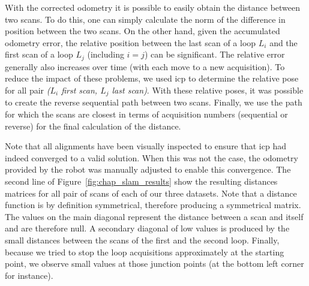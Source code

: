 With the corrected odometry it is possible to easily obtain the distance between two scans. To do this, one can simply calculate the norm of the difference in position between the two scans. On the other hand, given the accumulated odometry error, the relative position between the last scan of a loop $L_i$ and the first scan of a loop $L_j$ (including $i=j$) can be significant. The relative error generally also increases over time (with each move to a new acquisition). To reduce the impact of these problems, we used \gls*{icp} to determine the relative pose for all pair \textit{($L_i$ first scan, $L_j$ last scan)}. With these relative poses, it was possible to create the reverse sequential path between two scans. Finally, we use the path for which the scans are closest in terms of acquisition numbers (sequential or reverse) for the final calculation of the distance.

Note that all alignments have been visually inspected to ensure that \gls*{icp} had indeed converged to a valid solution. When this was not the case, the odometry provided by the robot was manually adjusted to enable this convergence. The second line of Figure~\ref{fig:chap_slam_results} show the resulting distances matrices for all pair of scans of each of our three datasets. Note that a distance function is by definition symmetrical, therefore producing a symmetrical matrix. The values on the main diagonal represent the distance between a scan and itself and are therefore null. A secondary diagonal of low values is produced by the small distances between the scans of the first and the second loop. Finally, because we tried to stop the loop acquisitions approximately at the starting point, we observe small values at those junction points (at the bottom left corner for instance).

